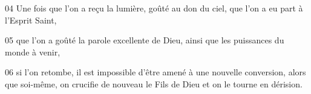 
04 Une fois que l’on a reçu la lumière, goûté au don du ciel, que l’on a eu part à l’Esprit Saint,

05 que l’on a goûté la parole excellente de Dieu, ainsi que les puissances du monde à venir,

06 si l’on retombe, il est impossible d’être amené à une nouvelle conversion, alors que soi-même, on crucifie de nouveau le Fils de Dieu et on le tourne en dérision.
